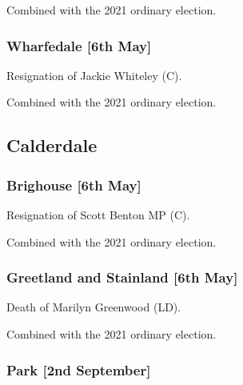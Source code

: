 \documentclass[a4paper,openany]{book}
\begin{document}
\begin{resultsiii}
Combined with the 2021 ordinary election.

\subsubsection*{Wharfedale \hspace*{\fill}\nolinebreak[1]%
	\enspace\hspace*{\fill}
	[6th May]}


Resignation of Jackie Whiteley (C).

Combined with the 2021 ordinary election.

\subsection*{Calderdale}

\subsubsection*{Brighouse \hspace*{\fill}\nolinebreak[1]%
	\enspace\hspace*{\fill}
	[6th May]}


Resignation of Scott Benton MP (C).

Combined with the 2021 ordinary election.

\subsubsection*{Greetland and Stainland \hspace*{\fill}\nolinebreak[1]%
	\enspace\hspace*{\fill}
	[6th May]}


Death of Marilyn Greenwood (LD).

Combined with the 2021 ordinary election.

\subsubsection*{Park \hspace*{\fill}\nolinebreak[1]%
	\enspace\hspace*{\fill}
	[2nd September]}


\end{resultsiii}
\end{document}
